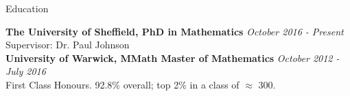 \documentclass{resume} %
\begin{document}

\begin{rSection}{Education}

{\bf The University of Sheffield, PhD in Mathematics} \hfill {\em October 2016 - Present} \\ 
Supervisor: Dr. Paul Johnson \smallskip \\
{\bf University of Warwick, MMath Master of Mathematics} \hfill {\em October 2012 - July 2016} \\
First Class Honours. 92.8\% overall; top 2\% in a class of $\approx$ 300.

\end{rSection}

\end{document}
